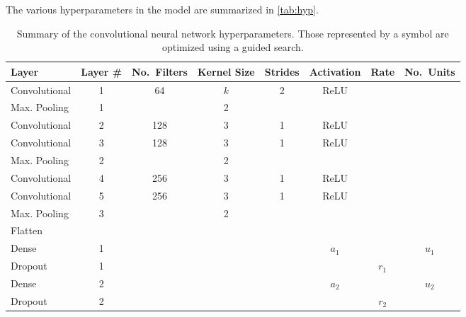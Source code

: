 \documentclass[Journal, letterpaper, DoubleSpace, InsideFigs]{ascelike-new}
\begin{document}
The various hyperparameters in the model are summarized in \autoref{tab:hyp}.
\begin{table}[]\small
{}
    \centering
    \begin{tabular}{l c c c c c c c}\toprule
    \bf Layer & \bf Layer \# & \bf No.\ Filters & \bf Kernel Size & \bf Strides &
    \bf Activation &   \bf Rate & \bf No.\ Units  \\\midrule
    Convolutional  & 1         & 64                & $k$   & 2           & ReLU && \\
    Max. Pooling   & 1         &                   & 2               &&&             &      \\
    Convolutional  & 2         & 128               & 3   & 1           & ReLU && \\
    Convolutional  & 3         & 128               & 3   & 1           & ReLU && \\
    Max. Pooling   & 2         &                   & 2               &&&             &      \\    
    Convolutional  & 4         & 256               & 3   & 1           & ReLU && \\
    Convolutional  & 5         & 256               & 3   & 1           & ReLU && \\
    Max. Pooling   & 3         &                   & 2               &             &&&      \\\midrule
    Flatten & & & & &&& \\\midrule
    Dense           & 1  & & &  &  $a_1$ & & $u_1$ \\
    Dropout         & 1  & & &  && $r_1$ &   \\
    Dense           & 2  & & &  &  $a_2$ & & $u_2$  \\
    Dropout         & 2  & & &  && $r_2$ &  \\ \bottomrule
    \end{tabular}
    \caption{Summary of the convolutional neural network hyperparameters. 
    Those represented by a symbol are optimized using a guided search.}
    \label{tab:hyp}
\end{table}
\end{document}
